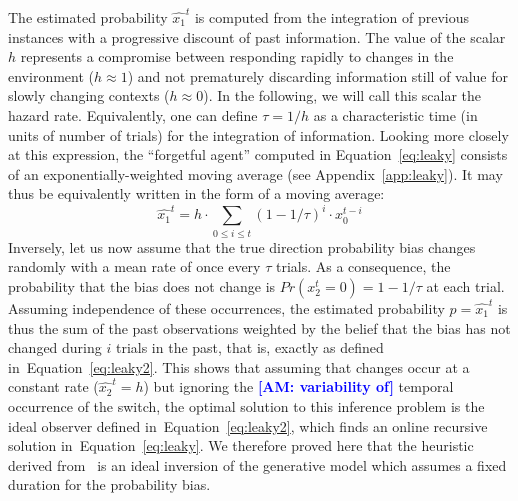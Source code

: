 \documentclass[12pt,english]{article}%
\newcommand{\eql}[1]{\begin{equation}#1\end{equation}}
\newcommand{\citet}[1]{\textcite{#1}}
\newcommand{\seeEq}[1]{Equation~\ref{eq:#1}}
\newcommand{\seeApp}[1]{Appendix~\ref{app:#1}}
\newcommand{\LP}[1]{\textbf{\textcolor{red}{[LP: #1]}}}
\newcommand{\AM}[1]{\textbf{\textcolor{blue}{[AM: #1]}}}
\begin{document}
The estimated probability $\hat{x_1}^{t}$ is computed
from the integration of previous instances
with a progressive discount of past information.
The value of the scalar $h$ represents
a compromise between responding rapidly
to changes in the environment ($h \approx 1$) and
not prematurely discarding information still of value
for slowly changing contexts  ($h \approx 0$).
In the following, we will call this scalar the hazard rate.
Equivalently, one can define $\tau = 1 / h$ as
a characteristic time (in units of number of trials)
for the integration of information.
Looking more closely at this expression,
the ``forgetful agent'' computed in \seeEq{leaky}
consists of an exponentially-weighted moving average (see \seeApp{leaky}).
It may thus be equivalently written in the form of a moving average:
\eql{
\hat{x_1}^{t} = h \cdot \sum_{0\leq i \leq t} (1 - 1/\tau)^{i} \cdot x_0^{t-i}
\label{eq:leaky2}}
Inversely, let us now assume that
the true direction probability bias changes randomly with a mean rate of once
every $\tau$ trials.
As a consequence, the probability that the bias does not change is $Pr(x_2^t=0)=1-1/\tau$ at each trial.
Assuming independence of these occurrences, the estimated probability $p=\hat{x_1}^{t}$ is thus the sum
of the past observations weighted by the belief that the bias has not changed during $i$ trials in the past, that is, exactly as defined in~\seeEq{leaky2}.
This shows that
assuming that changes occur at a constant rate ($\hat{x_2}^t=h$)
but ignoring the \AM{variability of} temporal occurrence of the switch,
the optimal solution to this inference problem is the
ideal observer defined in~\seeEq{leaky2},
which finds an online recursive solution in~\seeEq{leaky}.
We therefore proved here that the heuristic derived from~\citet{Anderson2006}
is an ideal inversion of the generative model
which assumes a fixed duration for the probability bias.
\end{document}
